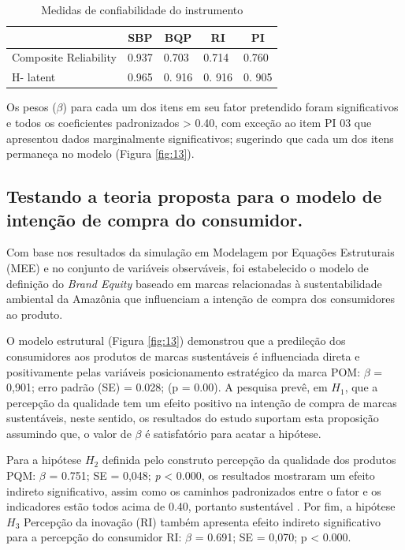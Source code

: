 \begin{table}[h]
\centering
\caption{Medidas de confiabilidade do instrumento}
\label{tab:14}
\begin{tabular}{lllll}
\hline
\multicolumn{1}{c}{}  & \multicolumn{1}{c}{SBP} & \multicolumn{1}{c}{BQP} & \multicolumn{1}{c}{RI} & \multicolumn{1}{c}{PI} \\ \hline
Composite Reliability & 0.937                   & 0.703                   & 0.714                  & 0.760                   \\
H- latent             & 0.965                   & 0. 916                  & 0. 916                 & 0. 905                  \\ \hline
\end{tabular}
\end{table}

Os pesos ($\beta$) para cada um dos itens em seu fator pretendido foram significativos e todos os coeficientes padronizados > 0.40, com exceção ao item PI 03 que apresentou dados marginalmente significativos; sugerindo que cada um dos itens permaneça no modelo (Figura \ref{fig:13}).

\subsection{Testando a teoria proposta para o modelo de intenção de compra do consumidor.}

Com base nos resultados da simulação em Modelagem por Equações Estruturais (MEE) e no conjunto de variáveis observáveis, foi estabelecido o modelo de definição do \textit{Brand Equity} baseado em marcas relacionadas à sustentabilidade ambiental da Amazônia que influenciam a intenção de compra dos consumidores ao produto.

O modelo estrutural (Figura \ref{fig:13}) demonstrou que a predileção dos consumidores aos produtos de marcas sustentáveis é influenciada direta e positivamente pelas variáveis posicionamento estratégico da marca POM: $\beta$ = 0,901; erro padrão (SE) = 0.028; (p = 0.00). A pesquisa prevê, em $H_1$, que a percepção da qualidade tem um efeito positivo na intenção de compra de marcas sustentáveis, neste sentido, os resultados do estudo suportam esta proposição assumindo que, o valor de $\beta$ é satisfatório para acatar a hipótese.

Para a hipótese $H_2$ definida pelo construto percepção da qualidade dos produtos PQM: $\beta$ = 0.751; SE = 0,048; \textit{p} < 0.000, os resultados mostraram um efeito indireto significativo, assim como os caminhos padronizados entre o fator e os indicadores estão todos acima de 0.40, portanto sustentável \cite{Wang2019StructuralModels}. Por fim, a hipótese $H_3$ Percepção da inovação (RI) também apresenta efeito indireto significativo para a percepção do consumidor RI: $\beta$ = 0.691; SE = 0,070; p < 0.000.

